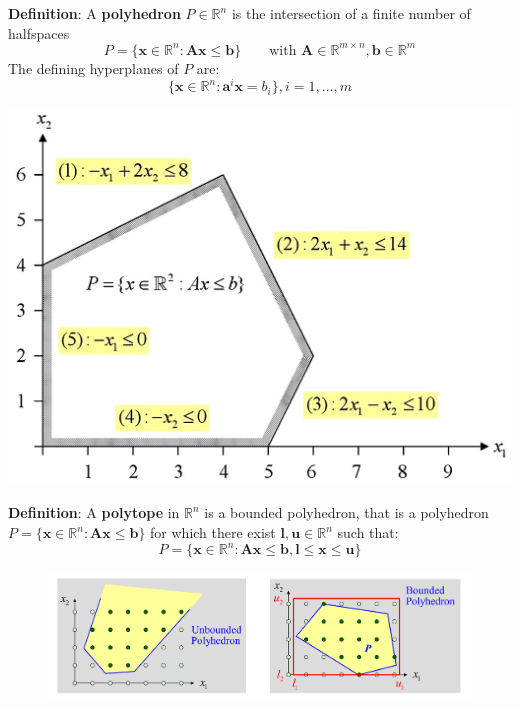 \documentclass[11pt]{article}
\begin{document}
\noindent
\begin{minipage}{0.6\linewidth}
	\textbf{Definition}: A \textbf{polyhedron} $P\in\mathbb{R}^n$ is the intersection of a finite number of halfspaces
	\begin{equation*}
		P=\{ \textbf{x}\in\mathbb{R}^n:\textbf{A}\textbf{x}\leq\textbf{b} \} \qquad \text{with }\textbf{A}\in\mathbb{R}^{m\times n}, \textbf{b}\in\mathbb{R}^m
	\end{equation*}
	\noindent
	The defining hyperplanes of $P$ are:
	\begin{equation*}
		\{ \textbf{x}\in\mathbb{R}^n:\textbf{a}^i\textbf{x}=b_i \}, i=1,\dots,m
	\end{equation*}
\end{minipage}
\begin{minipage}{0.4\linewidth}
	\centering
	\includegraphics[width=\linewidth]{polyhedron_hyperplanes}
\end{minipage}

\vspace{1em}
\noindent
\textbf{Definition}: A \textbf{polytope} in $\mathbb{R}^n$ is a bounded polyhedron, that is a polyhedron $P=\{ \textbf{x}\in\mathbb{R}^n:\textbf{A}\textbf{x}\leq\textbf{b} \}$ for which there exist $\textbf{l},\textbf{u}\in\mathbb{R}^n$ such that:
\begin{equation*}
	P=\{ \textbf{x}\in\mathbb{R}^n:\textbf{A}\textbf{x}\leq\textbf{b}, \textbf{l}\leq\textbf{x}\leq\textbf{u} \}
\end{equation*}

\begin{figure}[H]
	\centering
	\includegraphics[width=0.8\linewidth, keepaspectratio]{polytope}
\end{figure}
\end{document}
